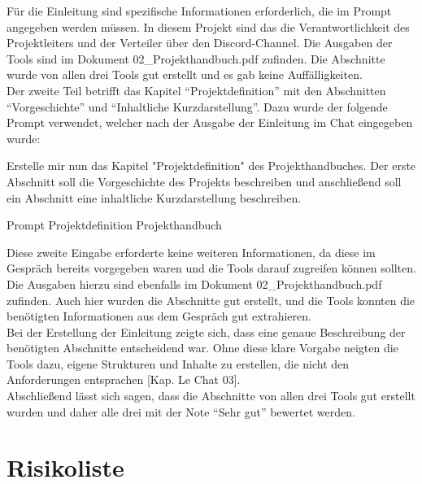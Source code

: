 Für die Einleitung sind spezifische Informationen erforderlich, die im Prompt angegeben werden müssen. In diesem Projekt sind das die 
Verantwortlichkeit des Projektleiters und der Verteiler über den Discord-Channel. Die Ausgaben der Tools sind im Dokument 02\_Projekthandbuch.pdf
zufinden. Die Abschnitte wurde von allen drei Tools gut erstellt und es gab keine Auffälligkeiten.\\ 

Der zweite Teil betrifft das Kapitel ``Projektdefinition'' mit den Abschnitten ``Vorgeschichte'' und ``Inhaltliche Kurzdarstellung''. Dazu wurde 
der folgende Prompt verwendet, welcher nach der Ausgabe der Einleitung im Chat eingegeben wurde:

\begin{prompt}[H]
    \begin{tcolorbox}[colback=gray!20, colframe=gray!20, boxrule=0pt, sharp corners] 
        Erstelle mir nun das Kapitel "Projektdefinition" des Projekthandbuches. Der erste Abschnitt soll die Vorgeschichte des Projekts 
        beschreiben und anschließend soll ein Abschnitt eine inhaltliche Kurzdarstellung beschreiben.
        \vfill
    \end{tcolorbox}
    \caption{Prompt Projektdefinition Projekthandbuch}
    \label{Prompt Projektdefinition Projekthandbuch}
\end{prompt}

Diese zweite Eingabe erforderte keine weiteren Informationen, da diese im Gespräch bereits vorgegeben waren und die Tools darauf zugreifen 
können sollten. Die Ausgaben hierzu sind ebenfalls im Dokument 02\_Projekthandbuch.pdf zufinden. Auch hier wurden die Abschnitte gut 
erstellt, und die Tools konnten die benötigten Informationen aus dem Gespräch gut extrahieren.\\

Bei der Erstellung der Einleitung zeigte sich, dass eine genaue Beschreibung der benötigten Abschnitte entscheidend war. Ohne diese klare 
Vorgabe neigten die Tools dazu, eigene Strukturen und Inhalte zu erstellen, die nicht den Anforderungen entsprachen [Kap. Le Chat 03].\\

Abschließend lässt sich sagen, dass die Abschnitte von allen drei Tools gut erstellt wurden und daher alle drei mit der Note ``Sehr gut'' 
bewertet werden.

\section{Risikoliste}  \label{CompRisikoliste}

